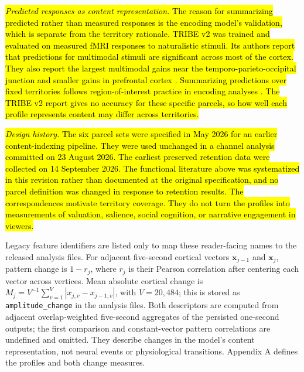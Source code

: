 \documentclass{ieeeaccess}
\newcommand{\rev}[1]{\hl{#1}}
\newcommand{\rev}[1]{#1}
\begin{document}
\rev{\textit{Predicted responses as content representation.} The reason for summarizing predicted rather than measured responses is the encoding model's validation, which is separate from the territory rationale. TRIBE v2 was trained and evaluated on measured fMRI responses to naturalistic stimuli. Its authors report that predictions for multimodal stimuli are significant across most of the cortex. They also report the largest multimodal gains near the temporo-parieto-occipital junction and smaller gains in prefrontal cortex \mbox{\cite{dascoli2026tribev2}}. Summarizing predictions over fixed territories follows region-of-interest practice in encoding analyses \mbox{\cite{naselaris2011encoding}}. The TRIBE v2 report gives no accuracy for these specific parcels, so how well each profile represents content may differ across territories.}

\rev{\textit{Design history.} The six parcel sets were specified in May 2026 for an earlier content-indexing pipeline. They were used unchanged in a channel analysis committed on 23 August 2026. The earliest preserved retention data were collected on 14 September 2026. The functional literature above was systematized in this revision rather than documented at the original specification, and no parcel definition was changed in response to retention results. The correspondences motivate territory coverage. They do not turn the profiles into measurements of valuation, salience, social cognition, or narrative engagement in viewers.}

Legacy feature identifiers are listed only to map these reader-facing names to the released analysis files. For adjacent five-second cortical vectors $\mathbf{x}_{j-1}$ and $\mathbf{x}_j$, pattern change is $1-r_j$, where $r_j$ is their Pearson correlation after centering each vector across vertices. Mean absolute cortical change is $M_j=V^{-1}\sum_{v=1}^{V}|x_{j,v}-x_{j-1,v}|$, with $V=20{,}484$; this is stored as \texttt{amplitude\_change} in the analysis files. Both descriptors are computed from adjacent overlap-weighted five-second aggregates of the persisted one-second outputs; the first comparison and constant-vector pattern correlations are undefined and omitted. They describe changes in the model's content representation, not neural events or physiological transitions. Appendix A defines the profiles and both change measures.
\end{document}
